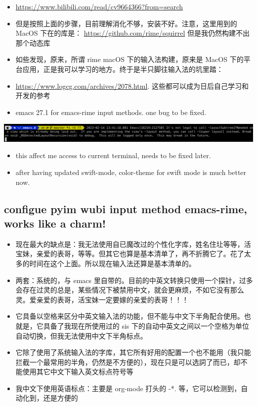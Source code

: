 \documentclass[9pt, b5paper]{article}
\begin{document}
\begin{itemize}
\item \url{https://www.bilibili.com/read/cv9664366?from=search}
\item 但是按照上面的步骤，目前理解消化不够，安装不好。注意，这里用到的 MacOS 下在的库是： \url{https://github.com/rime/squirrel} 但是我仍然构建不出那个动态库
\item 如些发现，原来，所谓 rime macOS 下的输入法构建，原来是 MacOS 下的平台应用，正是我可以学习的地方。终于是半只脚往输入法的坑里踏：
\item \url{https://www.logcg.com/archives/2078.html}. 这些都可以成为日后自己学习和开发的参考

\item emacs 27.1 for emacs-rime input methods. one bug to be fixed.
\end{itemize}

\includegraphics[width=.9\linewidth]{./pic/readme_20230214_134351.png}
\begin{itemize}
\item this affect me access to current terminal, needs to be fixed later.
\item after having updated swift-mode, color-theme for swift mode is much better now.
\end{itemize}
\subsection{configue pyim wubi input method emacs-rime, works like a charm!}
\label{sec-1-7}
\begin{itemize}
\item 现在最大的缺点是：我无法使用自已魔改过的个性化字库，姓名住圵等等，活宝妹，亲爱的表哥，等等。但其它也算是基本清单了，再不折腾它了。花了太多的时间在这个上面。所以现在输入法还算是基本清单的。
\item 两套：系统的，与 emacs 里自带的。目前的中英文转换只使用一个探针，过多会存在过灵的总是，某些情况下被禁用中文，就会更麻烦，不如它没有那么灵。爱亲爱的表哥，活宝妹一定要嫁的亲爱的表哥！！！
\item 它具备以空格来区分中英文输入法的功能，但不能与中文下半角配合使用。也就是，它具备了我现在所使用过的 sis 下的自动中英文之间以一个空格为单位自动切换，但我无法使用中文下半角标点。
\item 它除了使用了系统输入法的字库，其它所有好用的配置一个也不能用（我只能拦截一个最常用的半角，仍然是不方便的），现在只是可以选詞了而已，却不能使用其它中文下输入英文标点符号等
\item 我中文下使用英语标点：主要是 org-mode 打头的 -*. 等，它可以检测到，自动化到，还是方便的
\end{itemize}
\end{document}
